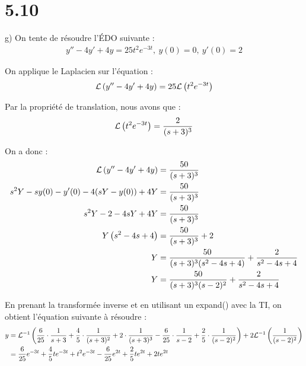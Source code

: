 \section*{5.10}

g) On tente de résoudre l'ÉDO suivante :
\begin{align*}
    y'' -4y' +4y = 25t^2 e^{-3t},\ y(0)=0,\ y'(0)=2
\end{align*}

On applique le Laplacien sur l'équation :
\begin{align*}
    \mathcal{L}\left({y'' -4y' +4y}\right) = 25\mathcal{L}\left({t^2 e^{-3t}}\right)
\end{align*}

Par la propriété de translation, nous avons que :
\begin{align*}
    \mathcal{L}\left({t^2 e^{-3t}}\right) = \dfrac{2}{(s+3)^3}
\end{align*}

On a donc :
\begin{align*}
    \mathcal{L}\left({y'' -4y' +4y}\right) &= \dfrac{50}{(s+3)^3} \\
    s^2Y -sy(0) -y'(0) -4(sY-y(0)) +4Y &= \dfrac{50}{(s+3)^3} \\
    s^2Y -2 -4sY +4Y &= \dfrac{50}{(s+3)^3} \\
    Y\left({s^2-4s+4}\right) &= \dfrac{50}{(s+3)^3} +2 \\
    Y &= \dfrac{50}{(s+3)^3(s^2-4s+4)} +\dfrac{2}{s^2-4s+4} \\
    Y &= \dfrac{50}{(s+3)^3(s-2)^2} +\dfrac{2}{s^2-4s+4}
\end{align*}

En prenant la transformée inverse et en utilisant un expand() avec la TI,
on obtient l'équation suivante à résoudre :
\begin{align*}
    y &= \mathcal{L}^{-1}\left({\dfrac{6}{25}\cdot \dfrac{1}{s+3} + \dfrac{4}{5}\cdot \dfrac{1}{(s+3)^2}
    + 2\cdot \dfrac{1}{(s+3)^3} - \dfrac{6}{25}\cdot \dfrac{1}{s-2} +
    \dfrac{2}{5}\cdot \dfrac{1}{(s-2)^2}}\right) +2\mathcal{L}^{-1}\left({\dfrac{1}{(s-2)^2}}\right) \\
    &= \dfrac{6}{25}e^{-3t} + \dfrac{4}{5}t e^{-3t} + t^2 e^{-3t} - \dfrac{6}{25}e^{2t}
    +\dfrac{2}{5}t e^{2t} +2t e^{2t}
\end{align*}
